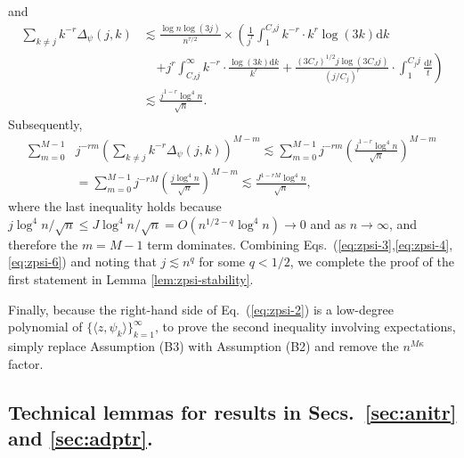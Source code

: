 \documentclass[11pt,a4paper]{article}
\theoremstyle{definition}
\theoremstyle{plain}
\theoremstyle{remark}
\newcommand{\ud}{\mathrm d}
\begin{document}
and 
\begin{align}
\sum_{k\neq j}k^{-r}\Delta_\psi(j,k) &\lesssim  \frac{\log n\log(3j)}{n^{\tau/2}}\times \left( \frac{1}{j^{r}}\int_1^{C_J j}k^{-r}\cdot k^{r}\log(3k)\ud k \right.\nonumber\\
&\;\;\;\;\left.+ j^{r}\int_{C_J j}^{\infty}k^{-r}\cdot\frac{\log(3k)\ud k}{k^{r}} + \frac{(3C_J)^{1/2} j\log(3C_Jj)}{(j/C_j)^{r}}\cdot \int_1^{C_j j}\frac{\ud t}{t}\right)\nonumber\\
&\lesssim \frac{j^{1-r}\log^{4}n}{\sqrt{n}}.\label{eq:zpsi-5}
\end{align}
Subsequently,
\begin{align}
\sum_{m=0}^{M-1}& j^{-rm}\left(\sum_{k\neq j}k^{-r}\Delta_\psi(j,k)\right)^{M-m}
\lesssim \sum_{m=0}^{M-1}j^{-rm}\left(\frac{j^{1-r}\log^4 n}{\sqrt{n}}\right)^{M-m}\nonumber\\
&= \sum_{m=0}^{M-1}j^{-rM}\left(\frac{j\log^4 n}{\sqrt{n}}\right)^{M-m} \lesssim \frac{J^{1-rM}\log^4 n}{\sqrt{n}},
\label{eq:zpsi-6}
\end{align}
where the last inequality holds because $j\log^4n/\sqrt{n}\leq J\log^4 n/\sqrt{n} = O(n^{1/2-q}\log^4 n)\to 0$ and as $n\to\infty$, and therefore the $m=M-1$ term dominates.
Combining Eqs.~(\ref{eq:zpsi-3},\ref{eq:zpsi-4},\ref{eq:zpsi-6}) and noting that $j\lesssim n^q$ for some $q<1/2$, we complete the proof of the first statement in Lemma \ref{lem:zpsi-stability}.

Finally, because the right-hand side of Eq.~(\ref{eq:zpsi-2}) is a low-degree polynomial of $\{\langle z,\psi_k\rangle\}_{k=1}^{\infty}$,
to prove the second inequality involving expectations, simply replace Assumption (B3) with Assumption (B2) and remove the $n^{M\kappa}$ factor.


\subsection{Technical lemmas for results in Secs.~\ref{sec:anitr} and \ref{sec:adptr}.}
\end{document}
